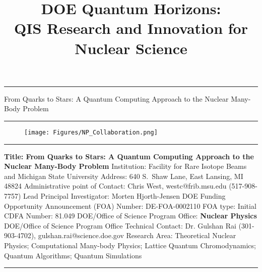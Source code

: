 \documentclass[10pt]{article}
\begin{document}
\thispagestyle{empty}

     \begin{center}
     \rule{\linewidth}{1mm}     
           \Huge From Quarks to Stars: A Quantum Computing Approach to the Nuclear Many-Body Problem
     \rule{\linewidth}{1mm}
     \end{center}
 \begin{center}
 \begin{figure}[hb]
 \texttt{[image: Figures/NP\_Collaboration.png]}
 \end{figure}
 \end{center}
\newpage
\title{DOE Quantum Horizons: \\ QIS Research and Innovation for Nuclear Science}
\maketitle
\rule{\linewidth}{1mm}
\begin{flushleft}
{\bf Title: From Quarks to Stars: A Quantum Computing Approach to the Nuclear Many-Body Problem}\newline
Institution: Facility for Rare Isotope Beams and Michigan State University\newline
Address: 640 S.~Shaw Lane, East Lansing, MI 48824\newline
Administrative point of Contact: Chris West, westc@frib.msu.edu (517-908-7757) \newline
Lead Principal Investigator: Morten Hjorth-Jensen\newline
DOE Funding Opportunity Announcement (FOA) Number: DE-FOA-0002110\newline
FOA type: Initial\newline
CDFA Number: 81.049\newline
DOE/Office of Science Program Office: {\bf Nuclear Physics}\newline
DOE/Office of Science Program Office Technical Contact: Dr. Gulshan Rai (301-903-4702), gulshan.rai@science.doe.gov\newline
Research Area: Theoretical Nuclear Physics; Computational Many-body Physics; Lattice Quantum Chromodynamics; Quantum Algorithms; Quantum Simulations
\end{flushleft}
\rule{\linewidth}{1mm}
\end{document}
